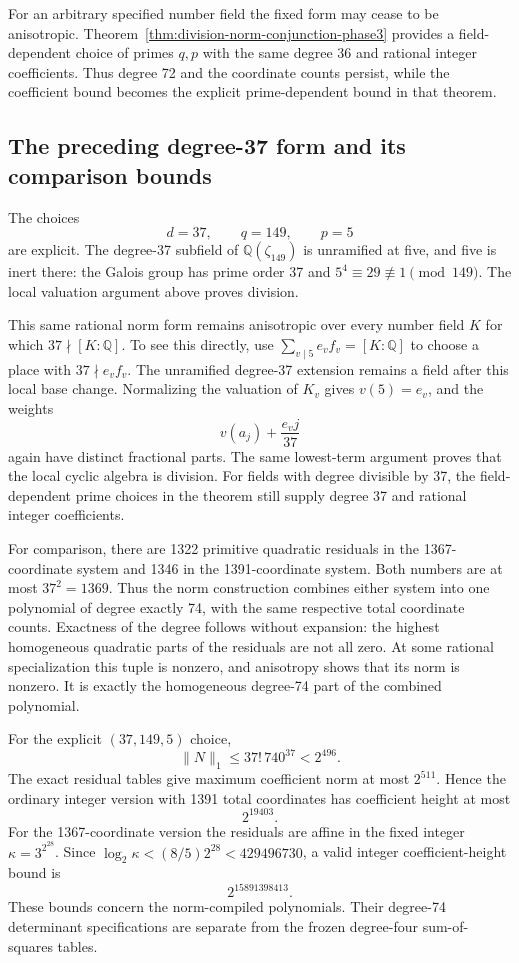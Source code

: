 \documentclass[11pt]{article}
\theoremstyle{definition}
\begin{document}
For an arbitrary specified number field the fixed form may
cease to be anisotropic.  Theorem~\ref{thm:division-norm-conjunction-phase3}
provides a field-dependent choice of primes $q,p$ with the
same degree 36 and rational integer coefficients.  Thus
degree 72 and the coordinate counts persist, while the
coefficient bound becomes the explicit prime-dependent bound
in that theorem.

\subsection{The preceding degree-37 form and its comparison bounds}

The choices
\[
                         d=37,\qquad q=149,\qquad p=5
\]
are explicit.  The degree-37 subfield of $\mathbb Q(\zeta_{149})$
is unramified at five, and five is inert there: the Galois group
has prime order 37 and $5^4\equiv29\not\equiv1\pmod{149}$.
The local valuation argument above proves division.

This same rational norm form remains anisotropic over every
number field $K$ for which $37\nmid[K:\mathbb Q]$.  To see
this directly, use
$\sum_{v\mid5}e_vf_v=[K:\mathbb Q]$ to choose a place with
$37\nmid e_vf_v$.  The unramified degree-37 extension remains
a field after this local base change.  Normalizing the valuation
of $K_v$ gives $v(5)=e_v$, and the weights
\[
                       v(a_j)+\frac{e_vj}{37}
\]
again have distinct fractional parts.  The same lowest-term
argument proves that the local cyclic algebra is division.
For fields with degree divisible by 37, the field-dependent
prime choices in the theorem still supply degree 37 and rational
integer coefficients.

For comparison, there are 1322 primitive quadratic residuals in the
1367-coordinate system and 1346 in the 1391-coordinate system.
Both numbers are at most $37^2=1369$.  Thus the norm construction
combines either system into one polynomial of degree exactly 74,
with the same respective total coordinate counts.  Exactness of
the degree follows without expansion: the highest homogeneous
quadratic parts of the residuals are not all zero.  At some
rational specialization this tuple is nonzero, and anisotropy
shows that its norm is nonzero.  It is exactly the homogeneous
degree-74 part of the combined polynomial.

For the explicit $(37,149,5)$ choice,
\[
               \|N\|_1\le37!\,740^{37}<2^{496}.
\]
The exact residual tables give maximum coefficient norm at most
$2^{511}$.  Hence the ordinary integer version with 1391 total
coordinates has coefficient height at most
\[
                              2^{19403}.
\]
For the 1367-coordinate version the residuals are affine in
the fixed integer $\kappa=3^{2^{28}}$.  Since
$\log_2\kappa<(8/5)2^{28}<429496730$, a valid integer
coefficient-height bound is
\[
                              2^{15891398413}.
\]
These bounds concern the norm-compiled polynomials.  Their
degree-74 determinant specifications are separate from the
frozen degree-four sum-of-squares tables.
\end{document}
